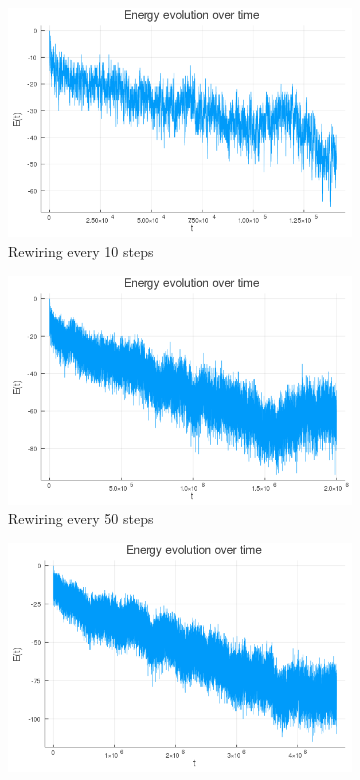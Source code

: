 \documentclass[12pt,openright,twoside]{book}
\begin{document}
\begin{figure}[!htb]
\centering
\begin{subfigure}{0.47\linewidth}
    \includegraphics[width=\linewidth]{figures/2_2_10rew/energy_evolution.png}
    \caption{Rewiring every 10 steps}
\end{subfigure}
\begin{subfigure}{0.47\linewidth}
    \includegraphics[width=\linewidth]{figures/2_2_50rew/energy_evolution.png}
    \caption{Rewiring every 50 steps}
\end{subfigure}
\begin{subfigure}{0.47\linewidth}
    \includegraphics[width=\linewidth]{figures/2_2_100rew/energy_evolution.png}

\end{subfigure}
\end{figure}
\end{document}
